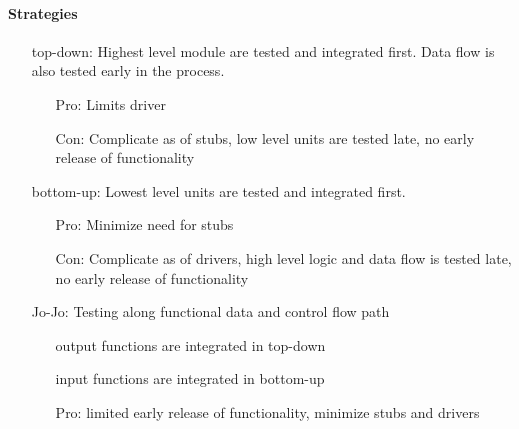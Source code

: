 
\begin{frame}[fragile]
\framesubtitle{Strategies}

\begin{enumerate}[align=parleft]
\item [\small top-down:] Highest level module are tested and integrated first. Data flow is also tested early in the process.
\begin{itemize}
\item [Pro:] Limits driver
\item [Con:] Complicate as of stubs, low level units are tested late, no early release of functionality
\end{itemize}
\item [\small bottom-up:] Lowest level units are tested and integrated first.
\begin{itemize}
\item [Pro:] Minimize need for stubs
\item [Con:] Complicate as of drivers, high level logic and data flow is tested late, no early release of functionality
\end{itemize}
\item [\small Jo-Jo:] Testing along functional data and control flow path
\begin{itemize}
\item [] output functions are integrated in top-down
\item [] input functions are integrated in bottom-up
\item [Pro:] limited early release of functionality, minimize stubs and drivers
\end{itemize}
\end{enumerate}
\end{frame}